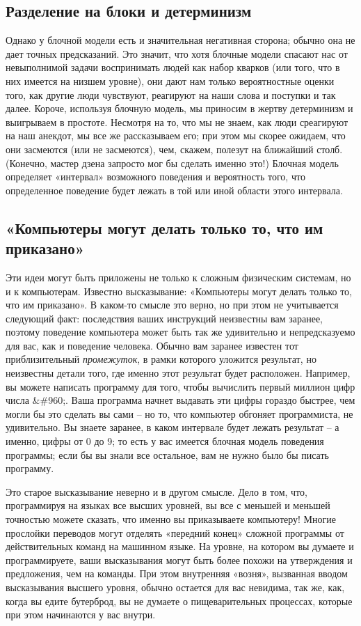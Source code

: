 \documentclass[../main.tex]{subfiles}
\begin{document}
\subsection{Разделение на блоки и детерминизм}

Однако у блочной модели есть и значительная негативная сторона; обычно она не дает точных предсказаний. Это значит, что хотя блочные модели спасают нас от невыполнимой задачи воспринимать людей как набор кварков (или того, что в них имеется на низшем уровне), они дают нам только вероятностные оценки того, как другие люди чувствуют, реагируют на наши слова и поступки и так далее. Короче, используя блочную модель, мы приносим в жертву детерминизм и выигрываем в простоте. Несмотря на то, что мы не знаем, как люди среагируют на наш анекдот, мы все же рассказываем его; при этом мы скорее ожидаем, что они засмеются (или не засмеются), чем, скажем, полезут на ближайший столб. (Конечно, мастер дзена запросто мог бы сделать именно это!) Блочная модель определяет «интервал» возможного поведения и вероятность того, что определенное поведение будет лежать в той или иной области этого интервала.


\subsection{«Компьютеры могут делать только то, что им приказано»}

Эти идеи могут быть приложены не только к сложным физическим системам, но и к компьютерам. Известно высказывание: «Компьютеры могут делать только то, что им приказано». В каком-то смысле это верно, но при этом не учитывается следующий факт: последствия ваших инструкций неизвестны вам заранее, поэтому поведение компьютера может быть так же удивительно и непредсказуемо для вас, как и поведение человека. Обычно вам заранее известен тот приблизительный \emph{промежуток}, в рамки которого уложится результат, но неизвестны детали того, где именно этот результат будет расположен. Например, вы можете написать программу для того, чтобы вычислить первый миллион цифр числа \&\#960;. Ваша программа начнет выдавать эти цифры гораздо быстрее, чем могли бы это сделать вы сами \--- но то, что компьютер обгоняет программиста, не удивительно. Вы знаете заранее, в каком интервале будет лежать результат \--- а именно, цифры от 0 до 9; то есть у вас имеется блочная модель поведения программы; если бы вы знали все остальное, вам не нужно было бы писать программу.

Это старое высказывание неверно и в другом смысле. Дело в том, что, программируя на языках все высших уровней, вы все с меньшей и меньшей точностью можете сказать, что именно вы приказываете компьютеру! Многие прослойки переводов могут отделять «передний конец» сложной программы от действительных команд на машинном языке. На уровне, на котором вы думаете и программируете, ваши высказывания могут быть более похожи на утверждения и предложения, чем на команды. При этом внутренняя «возня», вызванная вводом высказывания высшего уровня, обычно остается для вас невидима, так же, как, когда вы едите бутерброд, вы не думаете о пищеварительных процессах, которые при этом начинаются у вас внутри.
\end{document}
